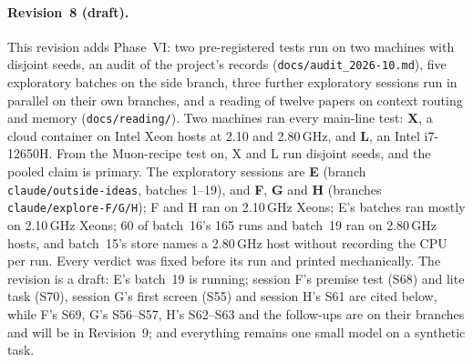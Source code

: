 \documentclass[11pt]{article}
\begin{document}
\paragraph{Revision~8 (draft).} This revision adds Phase~VI: two pre-registered tests run on two machines with disjoint seeds, an audit of the project's records (\texttt{docs/audit\_2026-10.md}), five exploratory batches on the side branch, three further exploratory sessions run in parallel on their own branches, and a reading of twelve papers on context routing and memory (\texttt{docs/reading/}). Two machines ran every main-line test: \textbf{X}, a cloud container on Intel Xeon hosts at 2.10 and 2.80\,GHz, and \textbf{L}, an Intel i7-12650H. From the Muon-recipe test on, X and L run disjoint seeds, and the pooled claim is primary. The exploratory sessions are \textbf{E} (branch \texttt{claude/outside-ideas}, batches 1--19), and \textbf{F}, \textbf{G} and \textbf{H} (branches \texttt{claude/explore-F/G/H}); F and H ran on 2.10\,GHz Xeons; E's batches ran mostly on 2.10\,GHz Xeons; 60 of batch~16's 165 runs and batch~19 ran on 2.80\,GHz hosts, and batch~15's store names a 2.80\,GHz host without recording the CPU per run. Every verdict was fixed before its run and printed mechanically. The revision is a draft: E's batch~19 is running; session F's premise test (S68) and lite task (S70), session G's first screen (S55) and session H's S61 are cited below, while F's S69, G's S56--S57, H's S62--S63 and the follow-ups are on their branches and will be in Revision~9; and everything remains one small model on a synthetic task.
\end{document}

